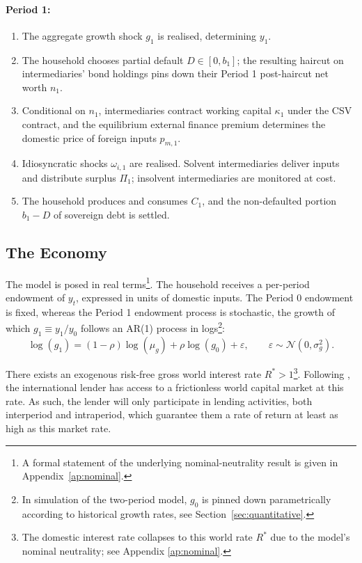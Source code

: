 \documentclass[11pt]{article}
\theoremstyle{definition}
\theoremstyle{plain}
\theoremstyle{remark}
\begin{document}
\paragraph{Period 1:}
\begin{enumerate}[label=(\alph*), itemsep=2pt, topsep=4pt]
    \item The aggregate growth shock $g_1$ is realised, determining $y_1$.
    \item The household chooses partial default $D \in [0, b_1]$; the resulting haircut on intermediaries' bond holdings pins down their Period 1 post-haircut net worth $n_1$.
    \item Conditional on $n_1$, intermediaries contract working capital $\kappa_1$ under the CSV contract, and the equilibrium external finance premium determines the domestic price of foreign inputs $p_{m,1}$.
    \item Idiosyncratic shocks $\omega_{i,1}$ are realised. Solvent intermediaries deliver inputs and distribute surplus $\Pi_1$; insolvent intermediaries are monitored at cost.
    \item The household produces and consumes $C_1$, and the non-defaulted portion $b_1 - D$ of sovereign debt is settled.
\end{enumerate}



\subsection{The Economy} \label{sec:economy}

The model is posed in real terms\footnote{A formal statement of the underlying nominal-neutrality result is given in Appendix~\ref{ap:nominal}.}. The household receives a per-period endowment of $y_t$, expressed in units of domestic inputs. The Period 0 endowment is fixed, whereas the Period 1 endowment process is stochastic, the growth of which $g_1 \equiv y_1/y_0$ follows an AR(1) process in logs\footnote{In simulation of the two-period model, $g_0$ is pinned down parametrically according to historical growth rates, see Section~\ref{sec:quantitative}.}:
\begin{equation}\label{eq:endowgrowth}
\log(g_1) = (1-\rho)\log(\mu_g) + \rho \log(g_0) + \varepsilon, \qquad \varepsilon \sim \mathcal{N}(0, \sigma_g^2).
\end{equation}

There exists an exogenous risk-free gross world interest rate $R^*>1$\footnote{The domestic interest rate collapses to this world rate $R^*$ due to the model's nominal neutrality; see Appendix \ref{ap:nominal}.}. Following \citet{eaton_debt_1981}, the international lender has access to a frictionless world capital market at this rate. As such, the lender will only participate in lending activities, both interperiod and intraperiod, which guarantee them a rate of return at least as high as this market rate.
\end{document}

